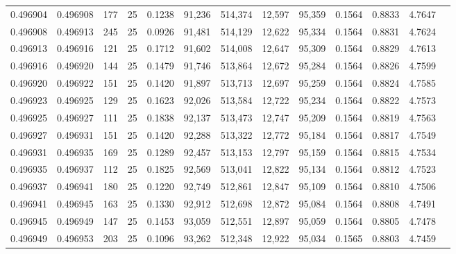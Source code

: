 \begin{tabular}{rrrrrrrrrrrrr}
0.496904 & 0.496908 & 177 &  25 &                                     0.1238 &  91,236 & 514,374 &  12,597 &  95,359 & 0.1564 & 0.8833 & 4.7647 \\
0.496908 & 0.496913 & 245 &  25 &                                     0.0926 &  91,481 & 514,129 &  12,622 &  95,334 & 0.1564 & 0.8831 & 4.7624 \\
0.496913 & 0.496916 & 121 &  25 &                                     0.1712 &  91,602 & 514,008 &  12,647 &  95,309 & 0.1564 & 0.8829 & 4.7613 \\
0.496916 & 0.496920 & 144 &  25 &                                     0.1479 &  91,746 & 513,864 &  12,672 &  95,284 & 0.1564 & 0.8826 & 4.7599 \\
0.496920 & 0.496922 & 151 &  25 &                                     0.1420 &  91,897 & 513,713 &  12,697 &  95,259 & 0.1564 & 0.8824 & 4.7585 \\
0.496923 & 0.496925 & 129 &  25 &                                     0.1623 &  92,026 & 513,584 &  12,722 &  95,234 & 0.1564 & 0.8822 & 4.7573 \\
0.496925 & 0.496927 & 111 &  25 &                                     0.1838 &  92,137 & 513,473 &  12,747 &  95,209 & 0.1564 & 0.8819 & 4.7563 \\
0.496927 & 0.496931 & 151 &  25 &                                     0.1420 &  92,288 & 513,322 &  12,772 &  95,184 & 0.1564 & 0.8817 & 4.7549 \\
0.496931 & 0.496935 & 169 &  25 &                                     0.1289 &  92,457 & 513,153 &  12,797 &  95,159 & 0.1564 & 0.8815 & 4.7534 \\
0.496935 & 0.496937 & 112 &  25 &                                     0.1825 &  92,569 & 513,041 &  12,822 &  95,134 & 0.1564 & 0.8812 & 4.7523 \\
0.496937 & 0.496941 & 180 &  25 &                                     0.1220 &  92,749 & 512,861 &  12,847 &  95,109 & 0.1564 & 0.8810 & 4.7506 \\
0.496941 & 0.496945 & 163 &  25 &                                     0.1330 &  92,912 & 512,698 &  12,872 &  95,084 & 0.1564 & 0.8808 & 4.7491 \\
0.496945 & 0.496949 & 147 &  25 &                                     0.1453 &  93,059 & 512,551 &  12,897 &  95,059 & 0.1564 & 0.8805 & 4.7478 \\
0.496949 & 0.496953 & 203 &  25 &                                     0.1096 &  93,262 & 512,348 &  12,922 &  95,034 & 0.1565 & 0.8803 & 4.7459 \\

\end{tabular}
